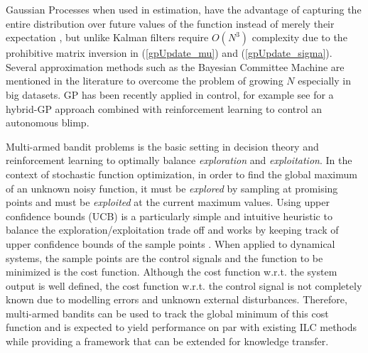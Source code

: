 \documentclass[10pt,a4paper]{article}
\begin{document}
Gaussian Processes when used in estimation, have the advantage of capturing the entire distribution over future values of the function instead of merely their expectation \cite{Rasmussen2}, but unlike Kalman filters require $O(N^3)$ complexity due to the prohibitive matrix inversion in (\ref{gpUpdate_mu}) and (\ref{gpUpdate_sigma}). 
Several approximation methods such as the Bayesian Committee Machine are mentioned in the literature \cite{GPbook} to overcome the problem of growing $N$ especially in big datasets.
%
GP has been recently applied in control, for example see \cite{Blimp} for a hybrid-GP
approach combined with reinforcement learning to control an autonomous blimp. 

Multi-armed bandit problems is the basic setting in decision theory and reinforcement learning to optimally balance \textit{exploration}  and \textit{exploitation}. In the context of stochastic function optimization, in order to find the global maximum of an unknown noisy function, it must be \textit{explored} by sampling at promising points and must be \textit{exploited} at the current maximum values. Using upper confidence bounds (UCB) is a particularly simple and intuitive heuristic to balance the exploration/exploitation trade off and works by keeping track of upper confidence bounds of the sample points \cite{Krause1}.  When applied to dynamical systems, 
the sample points are the control signals and the function to be minimized is the cost function. Although the cost function w.r.t. the system output is well defined, the cost function w.r.t. the control signal is not completely known due to modelling errors and unknown external disturbances. Therefore, multi-armed bandits can be used to track the global minimum of this cost function and is expected to yield  performance on par with existing ILC methods while providing a framework that can be extended for knowledge transfer.
\end{document}
